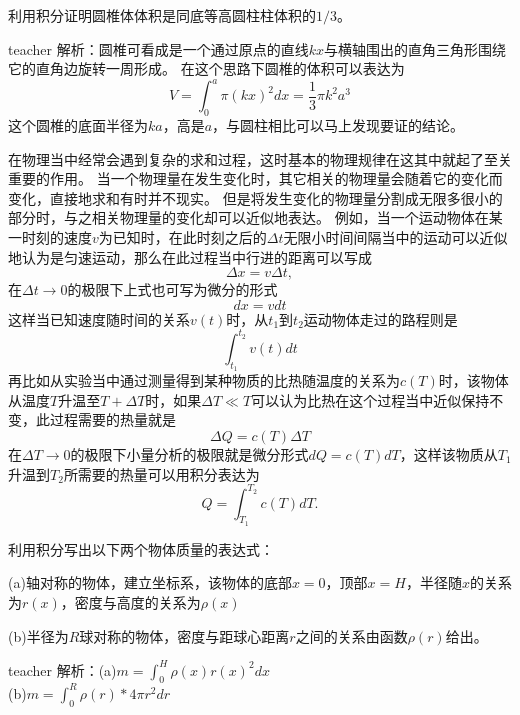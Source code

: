 \begin{example}
利用积分证明圆椎体体积是同底等高圆柱柱体积的$1/3$。
\begin{taggedblock}{teacher}
\newline
解析：圆椎可看成是一个通过原点的直线$kx$与横轴围出的直角三角形围绕它的直角边旋转一周形成。
在这个思路下圆椎的体积可以表达为
\[
V = \int_{0}^{a}\pi(kx)^2dx=\frac{1}{3}\pi k^2a^3
\]
这个圆椎的底面半径为$ka$，高是$a$，与圆柱相比可以马上发现要证的结论。
\end{taggedblock}
\end{example}

在物理当中经常会遇到复杂的求和过程，这时基本的物理规律在这其中就起了至关重要的作用。
当一个物理量在发生变化时，其它相关的物理量会随着它的变化而变化，直接地求和有时并不现实。
但是将发生变化的物理量分割成无限多很小的部分时，与之相关物理量的变化却可以近似地表达。
例如，当一个运动物体在某一时刻的速度$v$为已知时，在此时刻之后的$\Delta t$无限小时间间隔当中的运动可以近似地认为是匀速运动，那么在此过程当中行进的距离可以写成
\begin{equation}
\Delta x = v \Delta t,
\end{equation}
在$\Delta t\rightarrow 0$的极限下上式也可写为微分的形式
\begin{equation}
dx = vdt
\end{equation}
这样当已知速度随时间的关系$v(t)$时，从$t_1$到$t_2$运动物体走过的路程则是
\begin{equation}
\int_{t_1}^{t_2}v(t)dt
\end{equation}
再比如从实验当中通过测量得到某种物质的比热随温度的关系为$c(T)$时，该物体从温度$T$升温至$T+\Delta T$时，如果$\Delta T\ll T$可以认为比热在这个过程当中近似保持不变，此过程需要的热量就是
\begin{equation}
\Delta Q = c(T)\Delta T
\end{equation}
在$\Delta T\rightarrow 0$的极限下小量分析的极限就是微分形式$dQ = c(T)dT$，这样该物质从$T_1$升温到$T_2$所需要的热量可以用积分表达为
\begin{equation}
Q = \int_{T_1}^{T_2}c(T)dT.
\end{equation}


\begin{example}
利用积分写出以下两个物体质量的表达式：

(a)轴对称的物体，建立坐标系，该物体的底部$x=0$，顶部$x=H$，半径随$x$的关系为$r(x)$，密度与高度的关系为$\rho(x)$

(b)半径为$R$球对称的物体，密度与距球心距离$r$之间的关系由函数$\rho(r)$给出。
\begin{taggedblock}{teacher}
\newline
解析：(a)$m=\int_{0}^{H}\rho(x)r(x)^2dx$
\\(b)$m=\int_{0}^{R}\rho(r)*4\pi r^2 dr$
\end{taggedblock}
\end{example}

